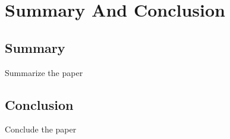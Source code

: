 \chapter{Summary And Conclusion}
\label{cha:Summary And Conclusion} %
\section{Summary}
Summarize the paper
\section{Conclusion}
Conclude the paper
